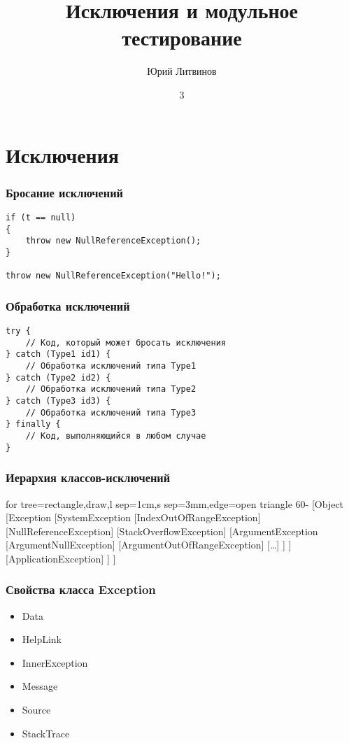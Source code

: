 \documentclass[xetex,mathserif,serif]{beamer}
\title{Исключения и модульное тестирование}
\author{Юрий Литвинов}
\date{3}
\begin{document}
	\frame{\titlepage}

	\section{Исключения}

	\begin{frame}[fragile]
		\frametitle{Бросание исключений}
		\begin{verbatim}
if (t == null)
{
    throw new NullReferenceException();
}

throw new NullReferenceException("Hello!");
		\end{verbatim}
	\end{frame}

	\begin{frame}[fragile]
		\frametitle{Обработка исключений}
		\begin{verbatim}
try {
    // Код, который может бросать исключения
} catch (Type1 id1) {
    // Обработка исключений типа Type1
} catch (Type2 id2) {
    // Обработка исключений типа Type2
} catch (Type3 id3) {
    // Обработка исключений типа Type3
} finally {
    // Код, выполняющийся в любом случае
}
		\end{verbatim}
	\end{frame}

	\begin{frame}
		\frametitle{Иерархия классов-исключений}
		\begin{tiny}
			\begin{forest}
				for tree={rectangle,draw,l sep=1cm,s sep=3mm,edge=open triangle 60-}
				[Object
					[Exception
						[SystemException
							[IndexOutOfRangeException]
							[NullReferenceException]
							[StackOverflowException]
							[ArgumentException
								[ArgumentNullException]
								[ArgumentOutOfRangeException]
								[\dots]
							]
						]
						[ApplicationException]
					]
				]
			\end{forest}
		\end{tiny}
	\end{frame}

	\begin{frame}[fragile]
		\frametitle{Свойства класса Exception}
		\begin{itemize}
			\item Data
			\item HelpLink
			\item InnerException
			\item Message
			\item Source
			\item StackTrace
		\end{itemize}
	\end{frame}
\end{document}
